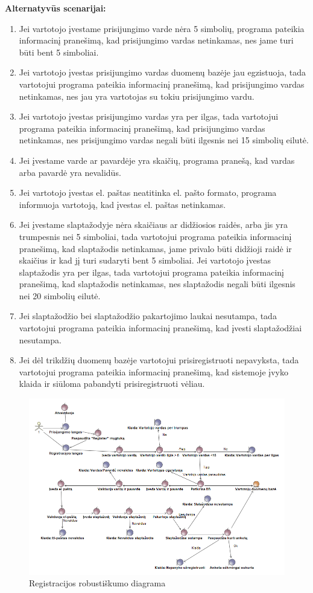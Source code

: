 \documentclass{VUMIFPSkursinis}
\begin{document}
	\textbf{Alternatyvūs scenarijai:}
	\begin{enumerate}[itemsep=-2mm]
		\item Jei vartotojo įvestame prisijungimo varde nėra 5 simbolių, programa pateikia informacinį pranešimą, kad prisijungimo vardas netinkamas, nes jame turi būti bent 5 simboliai.
		\item Jei vartotojo įvestas prisijungimo vardas duomenų bazėje jau egzistuoja, tada vartotojui programa pateikia informacinį pranešimą, kad prisijungimo vardas netinkamas, nes jau yra vartotojas su tokiu prisijungimo vardu.
		\item Jei vartotojo įvestas prisijungimo vardas yra per ilgas, tada vartotojui programa pateikia informacinį pranešimą, kad prisijungimo vardas netinkamas, nes prisijungimo vardas negali būti ilgesnis nei 15 simbolių eilutė.
		\item Jei įvestame varde ar pavardėje yra skaičių, programa pranešą, kad vardas arba pavardė yra nevalidūs.
		\item Jei vartotojo įvestas el. paštas neatitinka el. pašto formato, programa informuoja vartotoją, kad įvestas el. paštas netinkamas.
		\item Jei įvestame slaptažodyje nėra skaičiaus ar didžiosios raidės, arba jis yra trumpesnis nei 5 simboliai, tada vartotojui programa pateikia informacinį pranešimą, kad slaptažodis netinkamas, jame privalo būti didžioji raidė ir skaičius ir kad jį turi sudaryti bent 5 simboliai. Jei  vartotojo įvestas slaptažodis yra per ilgas, tada vartotojui programa pateikia informacinį pranešimą, kad slaptažodis netinkamas, nes slaptažodis negali būti ilgesnis nei 20 simbolių eilutė.
		\item Jei slaptažodžio bei slaptažodžio pakartojimo laukai nesutampa, tada vartotojui programa pateikia informacinį pranešimą, kad įvesti slaptažodžiai nesutampa.
		\item Jei dėl trikdžių duomenų bazėje vartotojui prisiregistruoti nepavyksta, tada vartotojui programa pateikia informacinį pranešimą, kad sistemoje įvyko klaida ir siūloma pabandyti prisiregistruoti vėliau.
	\end{enumerate} 
		\begin{figure}[H]
				\centering
				\includegraphics[scale=0.55]{img/Robustness_Registracija}
				\caption{Registracijos robustiškumo diagrama}
				\label{img:Registracijos robustiškumo diagrama}
			\end{figure}
\end{document}
